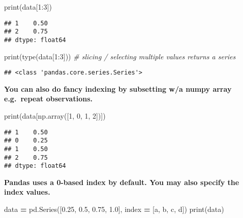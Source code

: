 \documentclass[
]{book}
\newenvironment{Shaded}{\begin{snugshade}}{\end{snugshade}}
\newcommand{\BuiltInTok}[1]{#1}
\newcommand{\CommentTok}[1]{\textcolor[rgb]{0.56,0.35,0.01}{\textit{#1}}}
\newcommand{\DecValTok}[1]{\textcolor[rgb]{0.00,0.00,0.81}{#1}}
\newcommand{\FloatTok}[1]{\textcolor[rgb]{0.00,0.00,0.81}{#1}}
\newcommand{\NormalTok}[1]{#1}
\newcommand{\OperatorTok}[1]{\textcolor[rgb]{0.81,0.36,0.00}{\textbf{#1}}}
\newcommand{\StringTok}[1]{\textcolor[rgb]{0.31,0.60,0.02}{#1}}
\begin{document}
\begin{Shaded}
\begin{Highlighting}[]
\BuiltInTok{print}\NormalTok{(data[}\DecValTok{1}\NormalTok{:}\DecValTok{3}\NormalTok{])}
\end{Highlighting}
\end{Shaded}

\begin{verbatim}
## 1    0.50
## 2    0.75
## dtype: float64
\end{verbatim}

\begin{Shaded}
\begin{Highlighting}[]
\BuiltInTok{print}\NormalTok{(}\BuiltInTok{type}\NormalTok{(data[}\DecValTok{1}\NormalTok{:}\DecValTok{3}\NormalTok{])) }\CommentTok{\# slicing / selecting multiple values returns a series}
\end{Highlighting}
\end{Shaded}

\begin{verbatim}
## <class 'pandas.core.series.Series'>
\end{verbatim}

\textbf{You can also do fancy indexing by subsetting w/a numpy array e.g.~repeat observations.}

\begin{Shaded}
\begin{Highlighting}[]
\BuiltInTok{print}\NormalTok{(data[np.array([}\DecValTok{1}\NormalTok{, }\DecValTok{0}\NormalTok{, }\DecValTok{1}\NormalTok{, }\DecValTok{2}\NormalTok{])])}
\end{Highlighting}
\end{Shaded}

\begin{verbatim}
## 1    0.50
## 0    0.25
## 1    0.50
## 2    0.75
## dtype: float64
\end{verbatim}

\textbf{Pandas uses a 0-based index by default. You may also specify the index values.}

\begin{Shaded}
\begin{Highlighting}[]
\NormalTok{data }\OperatorTok{=}\NormalTok{ pd.Series([}\FloatTok{0.25}\NormalTok{, }\FloatTok{0.5}\NormalTok{, }\FloatTok{0.75}\NormalTok{, }\FloatTok{1.0}\NormalTok{], index }\OperatorTok{=}\NormalTok{ [}\StringTok{\textquotesingle{}a\textquotesingle{}}\NormalTok{, }\StringTok{\textquotesingle{}b\textquotesingle{}}\NormalTok{, }\StringTok{\textquotesingle{}c\textquotesingle{}}\NormalTok{, }\StringTok{\textquotesingle{}d\textquotesingle{}}\NormalTok{])}
\BuiltInTok{print}\NormalTok{(data)}
\end{Highlighting}
\end{Shaded}
\end{document}

